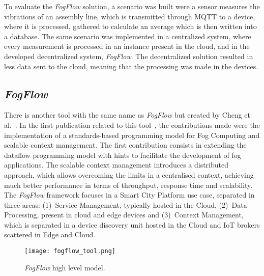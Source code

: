 To evaluate the \textit{FogFlow} solution, a scenario was built were a sensor measures the vibrations of an assembly line, which is transmitted through MQTT to a device, where it is processed, gathered to calculate an average which is then written into a database. The same scenario was implemented in a centralized system, where every measurement is processed in an instance present in the cloud, and in the developed decentralized system, \textit{FogFlow}. The decentralized solution resulted in less data sent to the cloud, meaning that the processing was made in the devices.

\subsection{\textit{FogFlow}}\label{sec:decentralized_sota_fogflow}

There is another tool with the same name as  \textit{FogFlow} but created by Cheng et al.~\cite{fogflow_github}. In the first publication related to this tool~\cite{fog_flow_easy}, the contributions made were the implementation of a standards-based programming model for Fog Computing and scalable context management. The first contribution consists in extending the dataflow programming model with hints to facilitate the development of fog applications. The scalable context management introduces a distributed approach, which allows overcoming the limits in a centralised context, achieving much better performance in terms of throughput, response time and scalability. The \textit{FogFlow} framework focuses in a Smart City Platform use case, separated in three areas: (1)~Service Management, typically hosted in the Cloud, (2)~Data Processing, present in cloud and edge devices and (3)~Context Management, which is separated in a device discovery unit hosted in the Cloud and IoT brokers scattered in Edge and Cloud.

\begin{figure}[h]
\centering
\texttt{[image: fogflow\_tool.png]}
\caption[\textit{FogFlow} high level model]{\textit{FogFlow} high level model\cite{fog_flow_tool}.}\label{fig:fogflow_tool}
\end{figure}

